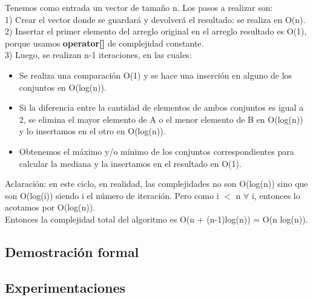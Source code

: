 Tenemos como entrada un vector de tamaño n. Los pasos a realizar son: \\

1) Crear el vector donde se guardará y devolverá el resultado: se realiza en O(n). \\

2) Insertar el primer elemento del arreglo original en el arreglo resultado es O(1), porque usamos \textbf{operator[]} de complejidad constante. \\

3) Luego, se realizan n-1 iteraciones, en las cuales: \\
\begin{itemize}
\item Se realiza una comparación O(1) y se hace una inserción en alguno de los conjuntos en O(log(n)).
\item Si la diferencia entre la cantidad de elementos de ambos conjuntos es igual a 2, se elimina el mayor elemento de A o el menor elemento de B en O(log(n)) y lo insertamos en el otro en O(log(n)).
\item Obtenemos el máximo y/o mínimo de los conjuntos correspondientes para calcular la mediana y la insertamos en el resultado en O(1).
\end{itemize}
Aclaración: en este ciclo, en realidad, las complejidades no son O(log(n)) sino que son O(log(i)) siendo i el número de iteración. Pero como i $<$ n $\forall$ i, entonces lo acotamos por O(log(n)). \\

Entonces la complejidad total del algoritmo es O(n + (n-1)log(n)) = O(n log(n)).

\subsection{Demostración formal}
\subsection{Experimentaciones}



